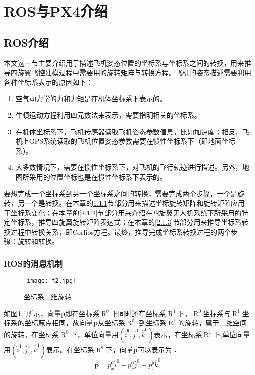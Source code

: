 
\chapter{ROS与PX4介绍}\label{introduction}

\section{ROS介绍}
本文这一节主要介绍用于描述飞机姿态位置的坐标系与坐标系之间的转换，用来推导四旋翼飞控建模过程中需要用的旋转矩阵与转换方程。飞机的姿态描述需要利用各种坐标系表示的原因如下：

\begin{enumerate}
	\item 空气动力学的力和力矩是在机体坐标系下表示的。
	\item 牛顿运动方程利用四元数法来表示，需要指明相关的坐标系。
	\item 在机体坐标系下，飞机传感器读取飞机姿态参数信息，比如加速度；相反，飞机上GPS系统读取的飞机位置姿态参数需要在惯性坐标系下（即地面坐标系）。
	\item 大多数情况下，需要在惯性坐标系下，对飞机的飞行轨迹进行描述。另外，地图所采用的位置坐标也是在惯性坐标系下表示的。
\end{enumerate}

要想完成一个坐标系到另一个坐标系之间的转换，需要完成两个步骤，一个是旋转，另一个是转换。在本章的\ref{2.1.1}节部分用来描述坐标旋转矩阵和旋转矩阵应用于坐标系变化；在本章的\ref{2.1.2}节部分用来介绍在四旋翼无人机系统下所采用的特定坐标系，推导四旋翼旋转矩阵表达式；在本章的\ref{2.1.3}节部分用来推导坐标系转换过程中转换关系，即Corlios方程。最终，推导完成坐标系转换过程的两个步骤：旋转和转换。


\subsection{ROS的消息机制} \label{2.1.1}

\begin{figure}[!ht]
\centering
\texttt{[image: f2.jpg]}
\caption{坐标系二维旋转} 
\label{fig2}
\end{figure}

如图\ref{fig2}所示，向量{\bf{p}}即在坐标系$\mathop R\nolimits^0$下同时还在坐标系$\mathop R\nolimits^1$下，$\mathop R\nolimits^0$坐标系与$\mathop R\nolimits^1$坐标系的坐标原点相同，故向量{\bf{p}}从坐标系$\mathop R\nolimits^0$ 到坐标系$\mathop R\nolimits^1 $的旋转，属于二维空间的旋转。在坐标系$\mathop R\nolimits^0$下，单位向量用$\left( {{{\hat i}^0},{{\hat j}^0},{{\hat k}^0}} \right)$表示，在坐标系$\mathop R\nolimits^1 $下,单位向量用$\left( {{{\hat i}^1},{{\hat j}^1},{{\hat k}^1}} \right)$表示。在坐标系$\mathop R\nolimits^0$下，向量{\bf{p}}可以表示为：
%
\begin{equation}
\mathbf{p} = p_{x}^{0} \hat{i}^0 + p_{y}^{0} \hat{j}^0 + p_{z}^{0} \hat{k}^0
\end{equation}

